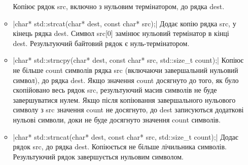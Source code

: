 \begin{enumerate}
\begin{itemize}
                        Копіює рядок src, включно з нульовим термінатором, до рядка dest.
                  \item {}|char* std::strcat(char* dest, const char* src);|
                        Додає копію рядка src, у кінець рядка dest.
                        Символ src[0] замінює нульовий термінатор в кінці dest.
                        Результуючий байтовий рядок є нуль-термінатором.
                  \item {}|char* std::strncpy(char* dest, const char* src, std::size_t count);|
                        Копіює не більше count символів рядка src
                        (включаючи завершальний нульовий символ), до рядка dest.
                        Якщо значення count досягнуто до того, як було скопійовано весь рядок src,
                        результуючий масив символів не буде завершуватися нулем.
                        Якщо після копіювання завершального нульового символу з src значення count
                        не досягнуто, до dest записуються додаткові нульові символи,
                        доки не буде досягнуто значення count символів.
                  \item {}|char* std::strncat(char* dest, const char* src, std::size_t count);|
                        Додає рядок src, до рядка dest. Копіюється не більше лічильника символів.
                        Результуючий рядок завершується нульовим символом.
            \end{itemize}
\end{enumerate}
